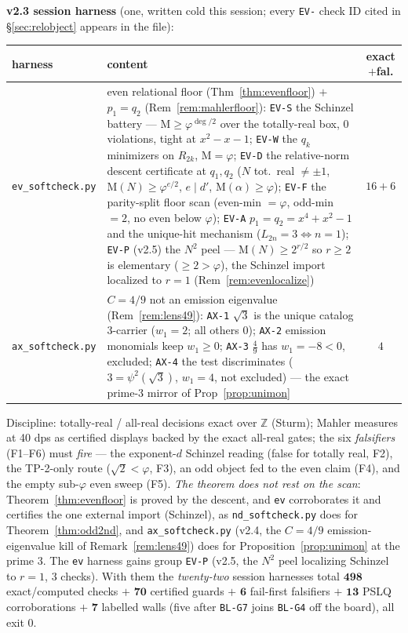 \documentclass[11pt]{article}
\newcommand{\hx}[1]{\textcolor{cC}{\footnotesize\texttt{#1}}}
\newcommand{\Z}{\mathbb{Z}}
\newcommand{\gp}{\varphi}
\newcommand{\M}{\mathrm{M}}
\theoremstyle{plain}
\theoremstyle{definition}
\theoremstyle{remark}
\begin{document}
\smallskip\noindent
\textbf{v2.3 session harness} (one, written cold this session; every \hx{EV-}
check ID cited in \S\ref{sec:relobject} appears in the file):
\begin{center}\footnotesize\setlength{\tabcolsep}{4pt}
\begin{tabular}{@{}lp{10.4cm}c@{}}
\toprule
harness & content & exact$+$fal.\\
\midrule
\texttt{ev\_softcheck.py} & even relational floor (Thm~\ref{thm:evenfloor}) $+$ $p_1{=}q_2$ (Rem~\ref{rem:mahlerfloor}): \hx{EV-S} the Schinzel battery --- $\M\ge\gp^{\deg/2}$ over the totally-real box, $0$ violations, tight at $x^2-x-1$; \hx{EV-W} the $q_k$ minimizers on $R_{2k}$, $\M=\gp$; \hx{EV-D} the relative-norm descent certificate at $q_1,q_2$ ($N$ tot.\ real $\ne\pm1$, $\M(N)\ge\gp^{e/2}$, $e\mid d'$, $\M(\alpha)\ge\gp$); \hx{EV-F} the parity-split floor scan (even-min $=\gp$, odd-min $=2$, no even below $\gp$); \hx{EV-A} $p_1=q_2=x^4+x^2-1$ and the unique-hit mechanism ($L_{2n}=3\iff n=1$); \hx{EV-P} (v2.5) the $N^2$ peel --- $\M(N)\ge2^{r/2}$ so $r\ge2$ is elementary ($\ge2>\gp$), the Schinzel import localized to $r=1$ (Rem~\ref{rem:evenlocalize}) & $16+6$\\
\texttt{ax\_softcheck.py} & $C{=}4/9$ not an emission eigenvalue (Rem~\ref{rem:lens49}): \hx{AX-1} $\sqrt3$ is the unique catalog $3$-carrier ($w_1{=}2$; all others $0$); \hx{AX-2} emission monomials keep $w_1\ge0$; \hx{AX-3} $\tfrac49$ has $w_1{=}-8<0$, excluded; \hx{AX-4} the test discriminates ($3{=}\psi^2(\sqrt3)$, $w_1{=}4$, not excluded) --- the exact prime-$3$ mirror of Prop~\ref{prop:unimon} & $4$\\
\bottomrule
\end{tabular}
\end{center}
Discipline: totally-real / all-real decisions exact over $\Z$ (Sturm); Mahler
measures at 40 dps as certified displays backed by the exact all-real gates;
the six \emph{falsifiers} (F1--F6) must \emph{fire} --- the exponent-$d$ Schinzel
reading (false for totally real, F2), the TP-2-only route ($\sqrt2<\gp$, F3), an
odd object fed to the even claim (F4), and the empty sub-$\gp$ even sweep (F5).
\emph{The theorem does not rest on the scan}: Theorem~\ref{thm:evenfloor} is proved
by the descent, and \texttt{ev} corroborates it and certifies the one external
import (Schinzel), as \texttt{nd\_softcheck.py} does for
Theorem~\ref{thm:odd2nd}, and \texttt{ax\_softcheck.py} (v2.4, the $C{=}4/9$
emission-eigenvalue kill of Remark~\ref{rem:lens49}) does for
Proposition~\ref{prop:unimon} at the prime $3$. The \texttt{ev} harness gains
group \hx{EV-P} (v2.5, the $N^2$ peel localizing Schinzel to $r=1$, $3$ checks).
With them the \emph{twenty-two} session harnesses total $\mathbf{498}$
exact/computed checks $+$ $\mathbf{70}$ certified guards $+$ $\mathbf{6}$
fail-first falsifiers $+$ $\mathbf{13}$ PSLQ corroborations $+$ $\mathbf{7}$
labelled walls (five after \hx{BL-G7} joins \hx{BL-G4} off the board), all exit 0.
\end{document}
